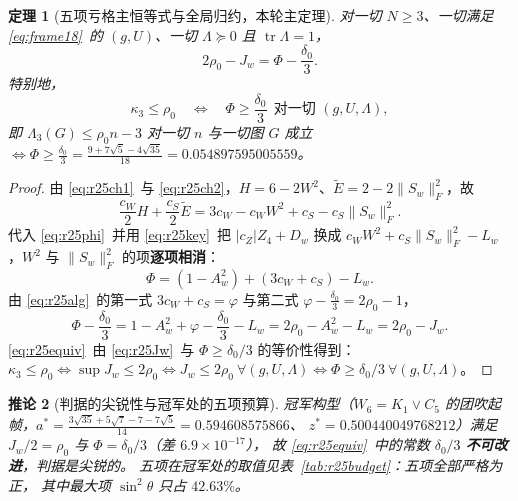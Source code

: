 \documentclass[UTF8,11pt]{ctexart}
\newtheorem{theorem}{定理}[section]
\newtheorem{corollary}[theorem]{推论}
\theoremstyle{definition}
\newcommand{\Lam}{\Lambda}
\newcommand{\tr}{\operatorname{tr}}
\begin{document}
\begin{theorem}[五项亏格主恒等式与全局归约，本轮主定理]\label{thm:r25main}
对一切 $N\ge3$、一切满足 \eqref{eq:frame18}~的 $(g,U)$、一切 $\Lam\succeq0$ 且 $\tr\Lam=1$，
\begin{equation}\label{eq:r25main}
2\rho_0-J_w=\Phi-\frac{\delta_0}3 .
\end{equation}
特别地，
\begin{equation}\label{eq:r25equiv}
\kappa_3\le\rho_0\quad\Longleftrightarrow\quad
\Phi\ge\frac{\delta_0}3\ \ \text{对一切 }(g,U,\Lam),
\end{equation}
即 $\Lam_3(G)\le\rho_0n-3$ 对一切 $n$ 与一切图 $G$ 成立
$\iff\Phi\ge\frac{\delta_0}3=\frac{9+7\sqrt5-4\sqrt{35}}{18}=0.054897595005559$。
\end{theorem}

\begin{proof}
由 \eqref{eq:r25ch1}~与 \eqref{eq:r25ch2}，$H=6-2W^2$、$\widetilde E=2-2\|S_w\|_F^2$，故
\[
\frac{c_W}2H+\frac{c_S}2\widetilde E
=3c_W-c_WW^2+c_S-c_S\|S_w\|_F^2 .
\]
代入 \eqref{eq:r25phi}~并用 \eqref{eq:r25key}~把 $|c_Z|Z_4+D_w$ 换成
$c_WW^2+c_S\|S_w\|_F^2-L_w$，$W^2$ 与 $\|S_w\|_F^2$ 的项\textbf{逐项相消}：
\[
\Phi=(1-A_w^2)+(3c_W+c_S)-L_w .
\]
由 \eqref{eq:r25alg}~的第一式 $3c_W+c_S=\varphi$ 与第二式 $\varphi-\frac{\delta_0}3=2\rho_0-1$，
\[
\Phi-\frac{\delta_0}3=1-A_w^2+\varphi-\frac{\delta_0}3-L_w
=2\rho_0-A_w^2-L_w=2\rho_0-J_w .
\]
\eqref{eq:r25equiv}~由 \eqref{eq:r25Jw}~与 $\Phi\ge\delta_0/3$ 的等价性得到：
$\kappa_3\le\rho_0\iff\sup J_w\le2\rho_0\iff J_w\le2\rho_0\ \forall(g,U,\Lam)
\iff\Phi\ge\delta_0/3\ \forall(g,U,\Lam)$。
\end{proof}

\begin{corollary}[判据的尖锐性与冠军处的五项预算]\label{cor:r25sharp}
冠军构型（$W_6=K_1\vee C_5$ 的团吹起帧，$a^*=\frac{3\sqrt{35}+5\sqrt7-7-7\sqrt5}{14}=0.594608575866$、
$z^*=0.500440049768212$）满足 $J_w/2=\rho_0$ 与 $\Phi=\delta_0/3$（差 $6.9\times10^{-17}$），
故 \eqref{eq:r25equiv}~中的常数 $\delta_0/3$ \textbf{不可改进}，判据是尖锐的。
五项在冠军处的取值见表~\ref{tab:r25budget}：五项\emph{全部严格为正}，
其中最大项 $\sin^2\theta$ 只占 $42.63\%$。
\end{corollary}
\end{document}
